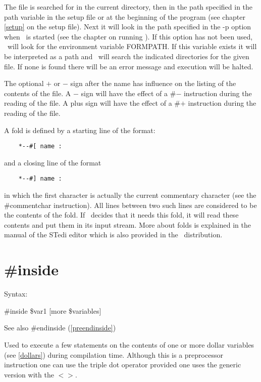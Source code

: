 The file is searched for in the current directory, then in the path 
specified in the path variable in the setup file or at the 
beginning of the program (see chapter \ref{setup} on the setup file). Next 
it will look in the path specified in the -p option when \FORM\ is started 
(see the chapter on running \FORM). If this option has not been used, \FORM\ 
will look for the environment variable FORMPATH. If this 
variable exists it will be interpreted as a path and \FORM\ will search the 
indicated directories for the given file. If none is found there will be an 
error message and execution will be halted.

The optional $+$ or $-$ sign after the name has influence on the listing of the 
contents of the file. A $-$ sign will have the effect of a \#$-$ instruction 
during the reading of the file. A plus sign will have the effect of a \#$+$ 
instruction during the reading of the file.

A fold is defined by a starting line of the format:
\begin{verbatim}
    *--#[ name :
\end{verbatim}
and a closing line of the format
\begin{verbatim}
    *--#] name :
\end{verbatim}
in which the first character is actually the current 
commentary character (see the \#commentchar instruction). 
All lines between two such lines are considered to be the contents of the 
fold. If \FORM\ decides that it needs this fold, it will read these contents 
and put them in its input stream. More about folds is explained in the 
manual of the STedi editor which is also provided in the \FORM\ 
distribution.


\section{\#inside}
\label{preinside}

\noindent Syntax:

\#inside \$var1 [more \$variables]
 
\noindent See also \#endinside (\ref{preendinside})

\noindent Used to execute a few statements on the contents 
of one or more dollar variables (see \ref{dollars}) during compilation time.
Although this is a preprocessor instruction one can use the 
triple dot operator provided one uses the generic version with the $<>$.

